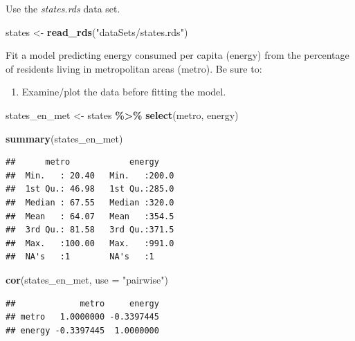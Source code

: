 \documentclass[
]{book}
\newenvironment{Shaded}{\begin{snugshade}}{\end{snugshade}}
\newcommand{\DataTypeTok}[1]{\textcolor[rgb]{0.13,0.29,0.53}{#1}}
\newcommand{\KeywordTok}[1]{\textcolor[rgb]{0.13,0.29,0.53}{\textbf{#1}}}
\newcommand{\NormalTok}[1]{#1}
\newcommand{\OperatorTok}[1]{\textcolor[rgb]{0.81,0.36,0.00}{\textbf{#1}}}
\newcommand{\StringTok}[1]{\textcolor[rgb]{0.31,0.60,0.02}{#1}}
\providecommand{\tightlist}{%
  \setlength{\itemsep}{0pt}\setlength{\parskip}{0pt}}
\begin{document}
\begin{alert}

Use the \emph{states.rds} data set.

\begin{Shaded}
\begin{Highlighting}[]
\NormalTok{  states \textless{}{-}}\StringTok{ }\KeywordTok{read\_rds}\NormalTok{(}\StringTok{"dataSets/states.rds"}\NormalTok{)}
\end{Highlighting}
\end{Shaded}

Fit a model predicting energy consumed per capita (energy) from the percentage of residents living in metropolitan areas (metro). Be sure to:

\begin{enumerate}
\def\labelenumi{\arabic{enumi}.}
\tightlist
\item
  Examine/plot the data before fitting the model.
\end{enumerate}

\begin{Shaded}
\begin{Highlighting}[]
\NormalTok{  states\_en\_met \textless{}{-}}\StringTok{ }
\StringTok{      }\NormalTok{states }\OperatorTok{\%\textgreater{}\%}\StringTok{ }
\StringTok{      }\KeywordTok{select}\NormalTok{(metro, energy)}

  \KeywordTok{summary}\NormalTok{(states\_en\_met)}
\end{Highlighting}
\end{Shaded}

\begin{verbatim}
##      metro            energy     
##  Min.   : 20.40   Min.   :200.0  
##  1st Qu.: 46.98   1st Qu.:285.0  
##  Median : 67.55   Median :320.0  
##  Mean   : 64.07   Mean   :354.5  
##  3rd Qu.: 81.58   3rd Qu.:371.5  
##  Max.   :100.00   Max.   :991.0  
##  NA's   :1        NA's   :1
\end{verbatim}

\begin{Shaded}
\begin{Highlighting}[]
  \KeywordTok{cor}\NormalTok{(states\_en\_met, }\DataTypeTok{use =} \StringTok{"pairwise"}\NormalTok{)}
\end{Highlighting}
\end{Shaded}

\begin{verbatim}
##             metro     energy
## metro   1.0000000 -0.3397445
## energy -0.3397445  1.0000000
\end{verbatim}


\end{alert}
\end{document}
